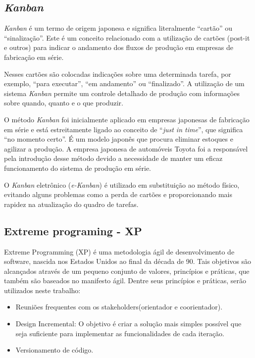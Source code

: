 \subsection{\textit{Kanban}}
\label{sec:kanban}
\textit{Kanban} é um termo de origem japonesa e significa literalmente “cartão” ou “sinalização”.
Este é um conceito relacionado com a utilização de cartões (post-it e outros) para indicar o andamento dos fluxos de produção em empresas de fabricação em série.

Nesses cartões são colocadas indicações sobre uma determinada tarefa, por exemplo, “para executar”, “em andamento” ou “finalizado”.
A utilização de um sistema \textit{Kanban} permite um controle detalhado de produção com informações sobre quando, quanto e o que produzir.

O método \textit{Kanban} foi inicialmente aplicado em empresas japonesas de fabricação em série e está estreitamente ligado ao conceito de “\textit{just in time}”, que significa “no momento certo”. É um modelo japonês que procura eliminar estoques e agilizar a produção.
A empresa japonesa de automóveis Toyota foi a responsável pela introdução desse método devido a necessidade de manter um eficaz funcionamento do sistema de produção em série.

O \textit{Kanban} eletrônico (\textit{e-Kanban}) é utilizado em substituição ao método físico, evitando alguns problemas como a perda de cartões e proporcionando mais rapidez na atualização do quadro de tarefas.\cite{kanban}



\subsection{Extreme programing - XP}
\label{sec:xp}
Extreme Programming (XP) é uma metodologia ágil de desenvolvimento de software,
nascida nos Estados Unidos ao final da década de 90. Tais objetivos são
alcançados através de um pequeno conjunto de valores, princípios
 e práticas, que também são baseados no manifesto ágil. Dentre seus princípios
e práticas, serão utilizados neste trabalho:

  \begin{itemize}
  \item Reuniões frequentes com os stakeholders(orientador e coorientador).
  \item Design Incremental: O objetivo é criar a solução mais simples possível
  que seja suficiente para implementar as funcionalidades de cada iteração.
  \cite{praticaXp}
  \item Versionamento de código.
  \cite{praticaXp}
  \end{itemize}

